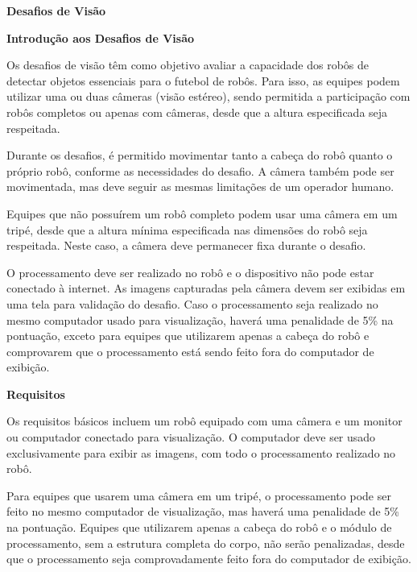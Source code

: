 \clearpage
\sffamily
{\bfseries\color[rgb]{0.4,0.4,0.4}Desafios de Visão}
{}

\bigskip

{\bfseries Introdução aos Desafios de Visão}

\headlinebox

Os desafios de visão têm como objetivo avaliar a capacidade dos robôs de detectar objetos essenciais para o futebol de robôs. Para isso, as equipes podem utilizar uma ou duas câmeras (visão estéreo), sendo permitida a participação com robôs completos ou apenas com câmeras, desde que a altura especificada seja respeitada.

Durante os desafios, é permitido movimentar tanto a cabeça do robô quanto o próprio robô, conforme as necessidades do desafio. A câmera também pode ser movimentada, mas deve seguir as mesmas limitações de um operador humano.

Equipes que não possuírem um robô completo podem usar uma câmera em um tripé, desde que a altura mínima especificada nas dimensões do robô seja respeitada. Neste caso, a câmera deve permanecer fixa durante o desafio.

O processamento deve ser realizado no robô e o dispositivo não pode estar conectado à internet. As imagens capturadas pela câmera devem ser exibidas em uma tela para validação do desafio. Caso o processamento seja realizado no mesmo computador usado para visualização, haverá uma penalidade de 5\% na pontuação, exceto para equipes que utilizarem apenas a cabeça do robô e comprovarem que o processamento está sendo feito fora do computador de exibição.

\bigskip

{\bfseries Requisitos}

\headlinebox

Os requisitos básicos incluem um robô equipado com uma câmera e um monitor ou computador conectado para visualização. O computador deve ser usado exclusivamente para exibir as imagens, com todo o processamento realizado no robô. 

Para equipes que usarem uma câmera em um tripé, o processamento pode ser feito no mesmo computador de visualização, mas haverá uma penalidade de 5\% na pontuação. Equipes que utilizarem apenas a cabeça do robô e o módulo de processamento, sem a estrutura completa do corpo, não serão penalizadas, desde que o processamento seja comprovadamente feito fora do computador de exibição.